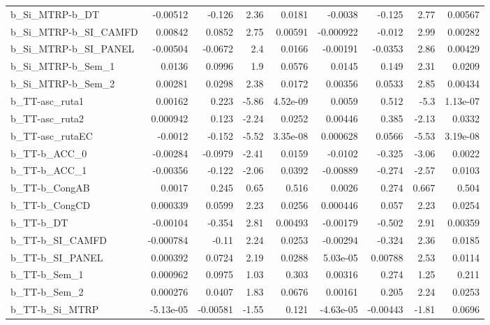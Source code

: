 \begin{tabular}{lrrrrrrrr}
b\_Si\_MTRP-b\_DT        &    -0.00512 &       -0.126 &    2.36 &   0.0181 &    -0.0038 &      -0.125 &         2.77 &       0.00567 \\
b\_Si\_MTRP-b\_SI\_CAMFD  &     0.00842 &       0.0852 &    2.75 &  0.00591 &  -0.000922 &      -0.012 &         2.99 &       0.00282 \\
b\_Si\_MTRP-b\_SI\_PANEL  &    -0.00504 &      -0.0672 &     2.4 &   0.0166 &   -0.00191 &     -0.0353 &         2.86 &       0.00429 \\
b\_Si\_MTRP-b\_Sem\_1     &      0.0136 &       0.0996 &     1.9 &   0.0576 &     0.0145 &       0.149 &         2.31 &        0.0209 \\
b\_Si\_MTRP-b\_Sem\_2     &     0.00281 &       0.0298 &    2.38 &   0.0172 &    0.00356 &      0.0533 &         2.85 &       0.00434 \\
b\_TT-asc\_ruta1        &     0.00162 &        0.223 &   -5.86 & 4.52e-09 &     0.0059 &       0.512 &         -5.3 &      1.13e-07 \\
b\_TT-asc\_ruta2        &    0.000942 &        0.123 &   -2.24 &   0.0252 &    0.00446 &       0.385 &        -2.13 &        0.0332 \\
b\_TT-asc\_rutaEC       &     -0.0012 &       -0.152 &   -5.52 & 3.35e-08 &   0.000628 &      0.0566 &        -5.53 &      3.19e-08 \\
b\_TT-b\_ACC\_0          &    -0.00284 &      -0.0979 &   -2.41 &   0.0159 &    -0.0102 &      -0.325 &        -3.06 &        0.0022 \\
b\_TT-b\_ACC\_1          &    -0.00356 &       -0.122 &   -2.06 &   0.0392 &   -0.00889 &      -0.274 &        -2.57 &        0.0103 \\
b\_TT-b\_CongAB         &      0.0017 &        0.245 &    0.65 &    0.516 &     0.0026 &       0.274 &        0.667 &         0.504 \\
b\_TT-b\_CongCD         &    0.000339 &       0.0599 &    2.23 &   0.0256 &   0.000446 &       0.057 &         2.23 &        0.0254 \\
b\_TT-b\_DT             &    -0.00104 &       -0.354 &    2.81 &  0.00493 &   -0.00179 &      -0.502 &         2.91 &       0.00359 \\
b\_TT-b\_SI\_CAMFD       &   -0.000784 &        -0.11 &    2.24 &   0.0253 &   -0.00294 &      -0.324 &         2.36 &        0.0185 \\
b\_TT-b\_SI\_PANEL       &    0.000392 &       0.0724 &    2.19 &   0.0288 &   5.03e-05 &     0.00788 &         2.53 &        0.0114 \\
b\_TT-b\_Sem\_1          &    0.000962 &       0.0975 &    1.03 &    0.303 &    0.00316 &       0.274 &         1.25 &         0.211 \\
b\_TT-b\_Sem\_2          &    0.000276 &       0.0407 &    1.83 &   0.0676 &    0.00161 &       0.205 &         2.24 &        0.0253 \\
b\_TT-b\_Si\_MTRP        &   -5.13e-05 &     -0.00581 &   -1.55 &    0.121 &  -4.63e-05 &    -0.00443 &        -1.81 &        0.0696 \\
\bottomrule
\end{tabular}
